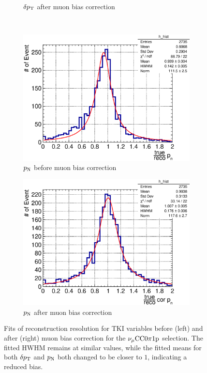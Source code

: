 \begin{figure}
\begin{subfigure}[b]{\dbfigwid\textwidth}
               \caption{$\delta p_\textrm{T}$ after muon bias correction}
               \label{subfig:esc-dpt-afmu}
          \end{subfigure}
          \\
          \begin{subfigure}[b]{\dbfigwid\textwidth}
               \centering
               \includegraphics[width=\textwidth]{figures/perf/tki/pn_rat_hist_al14.eps}
               \caption{$p_\textrm{N}$ before muon bias correction}
               \label{subfig:esc-pn-bfmu}
          \end{subfigure}
          \begin{subfigure}[b]{\dbfigwid\textwidth}
               \centering
               \includegraphics[width=\textwidth]{figures/perf/tki/cor_pn_rat_hist_al14.eps}
               \caption{$p_\textrm{N}$ after muon bias correction}
               \label{subfig:esc-pn-afmu}
          \end{subfigure}
          \caption{Fits of reconstruction resolution for TKI variables before (left) and after (right) muon bias correction for the $\nu_{\mu}\textrm{CC}0\pi1\textrm{p}$ selection. The fitted HWHM remains at similar values, while the fitted means for both $\delta p_\textrm{T}$ and $p_\textrm{N}$ both changed to be closer to $1$, indicating a reduced bias.}
          \label{fig:mc-tki-0pi-mubias}
     \end{figure}

